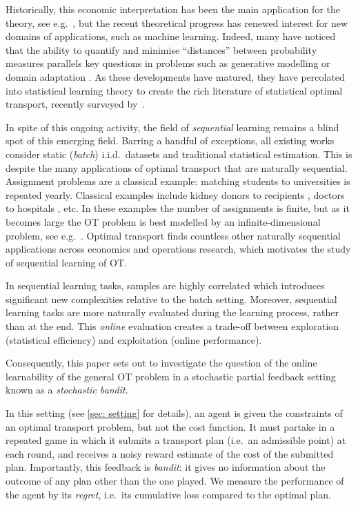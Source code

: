 Historically, this economic interpretation has been the main application for the theory, see e.g.\ \citep{galichon_unreasonable_2021,kreinovich_applications_2024}, but the recent theoretical progress has renewed interest for new domains of applications, such as machine learning. Indeed, many have noticed that the ability to quantify and minimise ``distances'' between probability measures parallels key questions in problems such as generative modelling \citep{arjovsky_wasserstein_2017} or domain adaptation \citep{courty_joint_2017}. As these developments have matured, they have percolated into statistical learning theory to create the rich literature of statistical optimal transport, recently surveyed by~\cite{chewi_statistical_2024}.

In spite of this ongoing activity, the field of \emph{sequential} learning remains a blind spot of this emerging field. Barring a handful of exceptions, all existing works consider static (\emph{batch}) i.i.d.\ datasets and traditional statistical estimation. This is despite the many applications of optimal transport that are naturally sequential. Assignment problems are a classical example: matching students to universities is repeated yearly. Classical examples 
include kidney donors to recipients \citep{glorie_allocation_2014}, doctors to hospitals \citep{hatfield_matching_2005}, etc. In these examples the number of assignments is finite, but as it becomes large the OT problem is best modelled by an infinite-dimensional problem, see e.g.\ \cite{cao_connecting_2024,carlier_optimal_2010}. Optimal transport finds countless other naturally sequential applications across economics and operations research, which motivates the study of sequential learning of OT. 

In sequential learning tasks, samples are highly correlated which introduces significant new complexities relative to the batch setting. Moreover, sequential learning tasks are more naturally evaluated during the learning process, rather than at the end. This \emph{online} evaluation creates a trade-off between exploration (statistical efficiency) and exploitation (online performance).

Consequently, this paper sets out to investigate the question of the online learnability of the general OT problem in a stochastic partial feedback setting known as a \emph{stochastic bandit}.

In this setting (see \cref{sec: setting} for details), an agent is given the constraints of an optimal transport problem, but not the cost function. It must partake in a repeated game in which it submits a transport plan (i.e.\ an admissible point) at each round, and receives a noisy reward estimate of the cost of the submitted plan. Importantly, this feedback is \emph{bandit}: it gives no information about the outcome of any plan other than the one played. We measure the performance of the agent by its \emph{regret}, i.e.\ its cumulative loss compared to the optimal plan.

